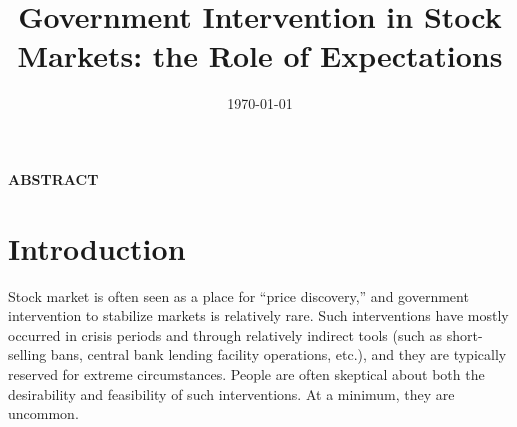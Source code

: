 \documentclass[12pt]{article}
\begin{document}
\onehalfspacing      %
\renewcommand{\thempfootnote}{\fnsymbol{mpfootnote}}


\vspace{1.5cm}
 \author{
 }

\title{\vspace*{0.0in}\Large \bf 
Government Intervention in Stock Markets: the Role of Expectations
}


\date{\today}              %


\maketitle


\thispagestyle{empty}
\onehalfspacing
\centerline{\bf ABSTRACT}

\noindent

\medskip

\vspace{0.1cm}


\thispagestyle{empty}
\setcounter{page}{1}


\newpage
\section{Introduction}

Stock market is often seen as a place for ``price discovery,'' and government intervention to stabilize markets is relatively rare. Such interventions have mostly occurred in crisis periods and through relatively indirect tools (such as short-selling bans, central bank lending facility operations, etc.), and they are typically reserved for extreme circumstances. People are often skeptical about both the desirability and feasibility of such interventions. At a minimum, they are uncommon.
\end{document}
